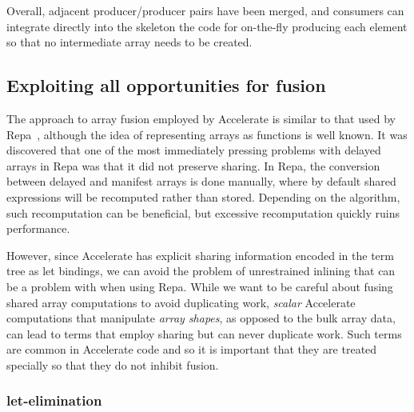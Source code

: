 Overall, adjacent producer/producer pairs have been merged, and consumers can
integrate directly into the skeleton the code for on-the-fly producing each
element so that no intermediate array needs to be created.


\subsection{Exploiting all opportunities for fusion}
\label{sec:binder_elimination}

The approach to array fusion employed by Accelerate is similar to that used by
Repa~\cite{Keller:2010er,Lippmeier:2011cd,Lippmeier:2012gx}, although the idea
of representing arrays as functions is well known. It was discovered that one of
the most immediately pressing problems with delayed arrays in Repa was that it
did not preserve sharing. In Repa, the conversion between delayed and manifest
arrays is done manually, where by default shared expressions will be recomputed
rather than stored. Depending on the algorithm, such recomputation can be
beneficial, but excessive recomputation quickly ruins performance.

However, since Accelerate has explicit sharing information encoded in the term
tree as let bindings, we can avoid the problem of unrestrained inlining that can
be a problem with when using Repa. While we want to be careful about fusing
shared array computations to avoid duplicating work, \emph{scalar} Accelerate
computations that manipulate \emph{array shapes}, as opposed to the bulk array
data, can lead to terms that employ sharing but can never duplicate work. Such
terms are common in Accelerate code and so it is important that they are treated
specially so that they do not inhibit fusion.


\subsubsection{let-elimination}

